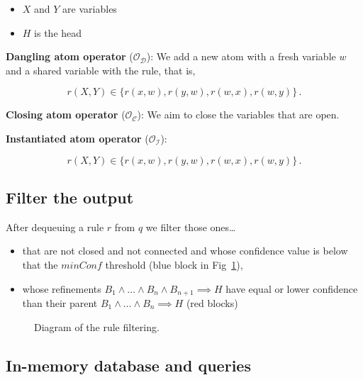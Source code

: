 \documentclass{article}
\begin{document}
\begin{itemize}
    \item $X$ and $Y$ are variables
    \item $H$ is the head
\end{itemize}

\noindent \textbf{Dangling atom operator} ($\mathcal{O}_\mathcal{D}$): We add a new atom with a
fresh variable $w$ and a shared variable with the rule, that is,

\begin{equation}
    r(X, Y) \in \{ r(x, w), r(y, w), r(w, x), r(w, y) \}\,.
\end{equation}

\noindent \textbf{Closing atom operator} ($\mathcal{O}_\mathcal{C}$): We aim to close the variables
that are open.

\noindent \textbf{Instantiated atom operator} ($\mathcal{O}_\mathcal{I}$):

\begin{equation}
    r(X, Y) \in \{ r(x, w), r(y, w), r(w, x), r(w, y) \}\,.
\end{equation}

\subsection{Filter the output}
\label{ssec:filter_output}

After dequeuing a rule $r$ from $q$ we filter those ones\ldots

\begin{itemize}
    \item that are not closed and not connected and whose confidence value is
        below that the $minConf$ threshold (blue block in Fig~\ref{fig:accepted_for_output}),
    \item whose refinements $B_1 \land \ldots \land B_n \land B_{n+1} \implies H$
        have equal or lower confidence than their parent
        $B_1 \land \ldots \land B_n \implies H$ (red blocks)
\end{itemize}

\begin{figure}[H]
\centering
\resizebox{!}{0.50\textheight}{%
    
}
\caption{Diagram of the rule filtering.}
\label{fig:accepted_for_output}
\end{figure}

\subsection{In-memory database and queries}
\label{ssec:in_memory_database}
\end{document}
